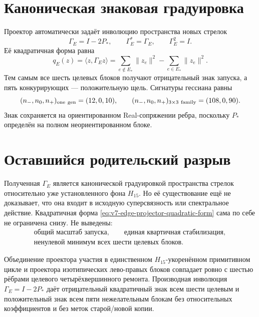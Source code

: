 \section{Каноническая знаковая градуировка}

Проектор автоматически задаёт инволюцию пространства новых стрелок
\begin{equation}
 \Gamma_E=I-2P_*,
 \qquad \Gamma_E^*=\Gamma_E,
 \qquad \Gamma_E^2=I.
 \label{eq:v7-edge-projector-grading}
\end{equation}
Её квадратичная форма равна
\begin{equation}
 q_E(z)=\langle z,\Gamma_Ez\rangle
 =\sum_{e\notin E_*}\|z_e\|^2-\sum_{e\in E_*}\|z_e\|^2.
 \label{eq:v7-edge-projector-quadratic-form}
\end{equation}
Тем самым все шесть целевых блоков получают отрицательный знак запуска, а
пять конкурирующих --- положительную щель. Сигнатуры гессиана равны
\begin{equation}
 (n_-,n_0,n_+)_{\rm one\ gen}=(12,0,10),
 \qquad
 (n_-,n_0,n_+)_{3\times3\rm\ family}=(108,0,90).
 \label{eq:v7-edge-projector-hessian-signatures}
\end{equation}
Знак сохраняется на ориентированном Real-сопряжении ребра, поскольку
$P_*$ определён на полном неориентированном блоке.

\section{Оставшийся родительский разрыв}

Полученная $\Gamma_E$ является канонической градуировкой пространства
стрелок относительно уже установленного фона $H_{15}$. Но её существование
ещё не доказывает, что она входит в исходную суперсвязность или спектральное
действие. Квадратичная форма \eqref{eq:v7-edge-projector-quadratic-form}
сама по себе не ограничена снизу. Не выведены:
\begin{equation}
 \begin{gathered}
  \text{общий масштаб запуска},\qquad
  \text{единая квартичная стабилизация},\\
  \text{ненулевой минимум всех шести целевых блоков}.
 \end{gathered}
 \label{eq:v7-edge-projector-parent-gaps}
\end{equation}

\begin{theorem}
Объединение проектора участия в единственном $H_{15}$-укоренённом
примитивном цикле и проектора изотипических лево-правых блоков совпадает
ровно с шестью рёбрами целевого четырёхвершинного ремонта. Производная
инволюция $\Gamma_E=I-2P_*$ даёт отрицательный квадратичный знак всем шести
целевым и положительный знак всем пяти нежелательным блокам без
относительных коэффициентов и без меток старой/новой копии.
\end{theorem}

